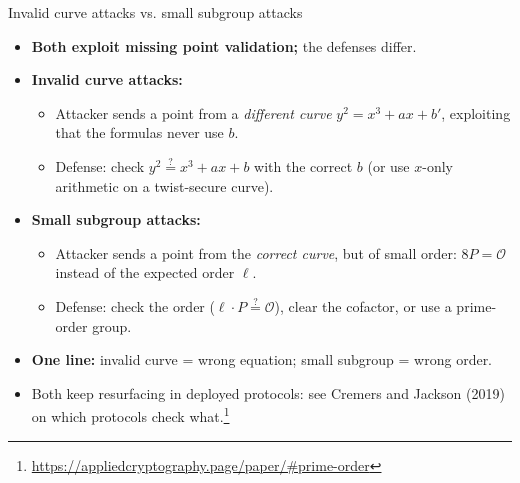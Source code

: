 \ifdefined\PRESENTATION\else\PassOptionsToClass{handout}{beamer}\fi\documentclass[aspectratio=169, lualatex]{beamer}
\begin{document}
\begin{frame}{Invalid curve attacks vs. small subgroup attacks}
	\begin{itemize}
		\item \textbf{Both exploit missing point validation;} the defenses differ.
		\item \textbf{Invalid curve attacks:}
		      \begin{itemize}
			      \item Attacker sends a point from a \emph{different curve} $y^2 = x^3 + ax + b'$, exploiting that the formulas never use $b$.
			      \item Defense: check $y^2 \stackrel{?}{=} x^3 + ax + b$ with the correct $b$ (or use $x$-only arithmetic on a twist-secure curve).
		      \end{itemize}
		\item \textbf{Small subgroup attacks:}
		      \begin{itemize}
			      \item Attacker sends a point from the \emph{correct curve}, but of small order: $8P = \mathcal{O}$ instead of the expected order $\ell$.
			      \item Defense: check the order ($\ell \cdot P \stackrel{?}{=} \mathcal{O}$), clear the cofactor, or use a prime-order group.
		      \end{itemize}
		\item \textbf{One line:} invalid curve = wrong equation; small subgroup = wrong order.
		\item Both keep resurfacing in deployed protocols: see Cremers and Jackson (2019) on which protocols check what.\footnote{\url{https://appliedcryptography.page/paper/\#prime-order}}
	\end{itemize}
\end{frame}
\end{document}
